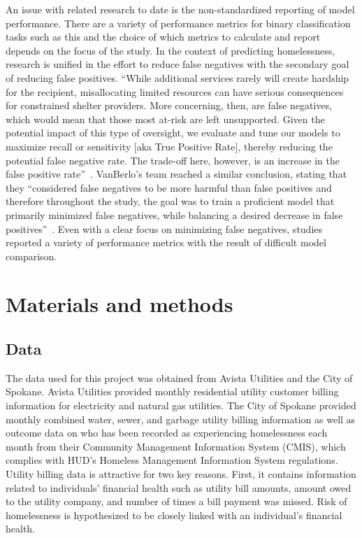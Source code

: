 \documentclass[10pt,letterpaper]{article}
\newcommand{\red}[1]{{\color{red}{#1}}}
\begin{document}
An issue with related research to date is the non-standardized reporting of model performance. There are a variety of performance metrics for binary classification tasks such as this and the choice of which metrics to calculate and report depends on the focus of the study. In the context of predicting homelessness, research is unified in the effort to reduce false negatives with the secondary goal of reducing false positives. ``While additional services rarely will create hardship for the recipient, misallocating limited resources can have serious consequences for constrained shelter providers. More concerning, then, are false negatives, which would mean that those most at-risk are left unsupported. Given the potential impact of this type of oversight, we evaluate and tune our models to maximize recall or sensitivity [aka True Positive Rate], thereby reducing the potential false negative rate. The trade-off here, however, is an increase in the false positive rate''~\cite{hong2018applications}. VanBerlo's team reached a similar conclusion, stating that they ``considered false negatives to be more harmful than false positives and therefore throughout the study, the goal was to train a proficient model that primarily minimized false negatives, while balancing a desired decrease in false positives''~\cite{vanberlo2021interpretable}. Even with a clear focus on minimizing false negatives, studies reported a variety of performance metrics with the result of difficult model comparison. \red{remove previous paragraph?}

\section*{Materials and methods}
\subsection*{Data}
The data used for this project was obtained from Avista Utilities and the City of Spokane. Avista Utilities provided monthly residential utility customer billing information for electricity and natural gas utilities. The City of Spokane provided monthly combined water, sewer, and garbage utility billing information as well as outcome data on who has been recorded as experiencing homelessness each month from their Community Management Information System (CMIS), which complies with HUD's Homeless Management Information System regulations. Utility billing data is attractive for two key reasons. First, it contains information related to individuals' financial health such as utility bill amounts, amount owed to the utility company, and number of times a bill payment was missed. Risk of homelessness is hypothesized to be closely linked with an individual's financial health.
\end{document}
